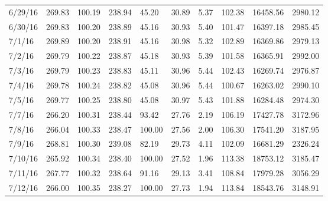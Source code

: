\documentclass[12pt,a4paper]{report}
\begin{document}
\begin{table}[H]
\begin{adjustbox}{width=1\textwidth}
\begin{tabular}{@{}llllllllll@{}}
6/29/16       & 269.83       & 100.19       & 238.94      & 45.20           & 30.89        & 5.37         & 102.38       & 16458.56     & 2980.12      \\
6/30/16       & 269.83       & 100.20       & 238.89      & 45.16           & 30.93        & 5.40         & 101.47       & 16397.18     & 2985.45      \\
7/1/16        & 269.89       & 100.20       & 238.91      & 45.16           & 30.98        & 5.32         & 102.89       & 16369.86     & 2979.13      \\
7/2/16        & 269.79       & 100.22       & 238.87      & 45.18           & 30.93        & 5.39         & 101.58       & 16365.91     & 2992.00      \\
7/3/16        & 269.79       & 100.23       & 238.83      & 45.11           & 30.96        & 5.44         & 102.43       & 16269.74     & 2976.87      \\
7/4/16        & 269.78       & 100.24       & 238.82      & 45.08           & 30.96        & 5.44         & 100.67       & 16263.02     & 2990.10      \\
7/5/16        & 269.77       & 100.25       & 238.80      & 45.08           & 30.97        & 5.43         & 101.88       & 16284.48     & 2974.30      \\
7/7/16        & 266.20       & 100.31       & 238.44      & 93.42           & 27.76        & 2.19         & 106.19       & 17427.78     & 3172.96      \\
7/8/16        & 266.04       & 100.33       & 238.47      & 100.00          & 27.56        & 2.00         & 106.30       & 17541.20     & 3187.95      \\
7/9/16        & 268.81       & 100.30       & 239.08      & 82.19           & 29.73        & 4.11         & 102.09       & 16681.29     & 2326.24      \\
7/10/16       & 265.92       & 100.34       & 238.40      & 100.00          & 27.52        & 1.96         & 113.38       & 18753.12     & 3185.47      \\
7/11/16       & 267.77       & 100.32       & 238.64      & 91.16           & 29.13        & 3.41         & 108.84       & 17979.28     & 3056.29      \\
7/12/16       & 266.00       & 100.35       & 238.27      & 100.00          & 27.73        & 1.94         & 113.84       & 18543.76     & 3148.91      \\ \bottomrule
\end{tabular}
\end{adjustbox}
\end{table}
\end{document}
